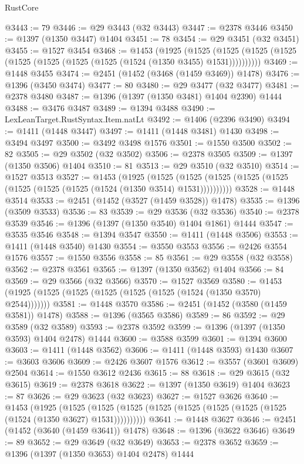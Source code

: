 \begin{lexlean}{RustCore}
\begin{coremodule}
@3443 := 79
@3446 := @29 @3443 (@32 @3443)
@3447 := @2378 @3446
@3450 := @1397 (@1350 @3447) @1404
@3451 := 78
@3454 := @29 @3451 (@32 @3451)
@3455 := @1527 @3454
@3468 := @1453
    (@1925
      (@1525 (@1525 (@1525 (@1525 (@1525 (@1525 (@1525 (@1525 (@1524 (@1350 @3455) @1531))))))))))
@3469 := @1448 @3455
@3474 := @2451 (@1452 (@3468 (@1459 @3469)) @1478)
@3476 := @1396 (@3450 @3474)
@3477 := 80
@3480 := @29 @3477 (@32 @3477)
@3481 := @2378 @3480
@3487 := @1396 (@1397 (@1350 @3481) @1404 @2390) @1444
@3488 := @3476 @3487
@3489 := @1394 @3488
@3490 := LexLeanTarget.RustSyntax.Item.natLt
@3492 := @1406 (@2396 @3490)
@3494 := @1411 (@1448 @3447)
@3497 := @1411 (@1448 @3481) @1430
@3498 := @3494 @3497
@3500 := @3492 @3498 @1576
@3501 := @1550 @3500
@3502 := 82
@3505 := @29 @3502 (@32 @3502)
@3506 := @2378 @3505
@3509 := @1397 (@1350 @3506) @1404
@3510 := 81
@3513 := @29 @3510 (@32 @3510)
@3514 := @1527 @3513
@3527 := @1453
    (@1925
      (@1525 (@1525 (@1525 (@1525 (@1525 (@1525 (@1525 (@1525 (@1524 (@1350 @3514) @1531))))))))))
@3528 := @1448 @3514
@3533 := @2451 (@1452 (@3527 (@1459 @3528)) @1478)
@3535 := @1396 (@3509 @3533)
@3536 := 83
@3539 := @29 @3536 (@32 @3536)
@3540 := @2378 @3539
@3546 := @1396 (@1397 (@1350 @3540) @1404 @1861) @1444
@3547 := @3535 @3546
@3548 := @1394 @3547
@3550 := @1411 (@1448 @3506)
@3553 := @1411 (@1448 @3540) @1430
@3554 := @3550 @3553
@3556 := @2426 @3554 @1576
@3557 := @1550 @3556
@3558 := 85
@3561 := @29 @3558 (@32 @3558)
@3562 := @2378 @3561
@3565 := @1397 (@1350 @3562) @1404
@3566 := 84
@3569 := @29 @3566 (@32 @3566)
@3570 := @1527 @3569
@3580 := @1453 (@1925 (@1525 (@1525 (@1525 (@1525 (@1525 (@1524 (@1350 @3570) @2544)))))))
@3581 := @1448 @3570
@3586 := @2451 (@1452 (@3580 (@1459 @3581)) @1478)
@3588 := @1396 (@3565 @3586)
@3589 := 86
@3592 := @29 @3589 (@32 @3589)
@3593 := @2378 @3592
@3599 := @1396 (@1397 (@1350 @3593) @1404 @2478) @1444
@3600 := @3588 @3599
@3601 := @1394 @3600
@3603 := @1411 (@1448 @3562)
@3606 := @1411 (@1448 @3593) @1430
@3607 := @3603 @3606
@3609 := @2426 @3607 @1576
@3612 := @3557 (@3601 @3609) @2504
@3614 := @1550 @3612 @2436
@3615 := 88
@3618 := @29 @3615 (@32 @3615)
@3619 := @2378 @3618
@3622 := @1397 (@1350 @3619) @1404
@3623 := 87
@3626 := @29 @3623 (@32 @3623)
@3627 := @1527 @3626
@3640 := @1453
    (@1925
      (@1525 (@1525 (@1525 (@1525 (@1525 (@1525 (@1525 (@1525 (@1524 (@1350 @3627) @1531))))))))))
@3641 := @1448 @3627
@3646 := @2451 (@1452 (@3640 (@1459 @3641)) @1478)
@3648 := @1396 (@3622 @3646)
@3649 := 89
@3652 := @29 @3649 (@32 @3649)
@3653 := @2378 @3652
@3659 := @1396 (@1397 (@1350 @3653) @1404 @2478) @1444

\end{coremodule}
\end{lexlean}
